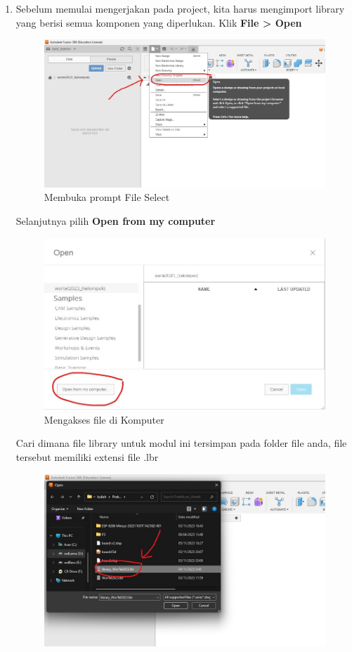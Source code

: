 \begin{enumerate}
\begin{figure}[H]
        \end{figure}
    \item Sebelum memulai mengerjakan pada project, kita harus mengimport library yang berisi semua komponen yang diperlukan. Klik \textbf{File > Open}
        \begin{figure}[H]
            \centering
            \includegraphics[width=0.6\linewidth]{P1/img/gambar3.jpeg}
            \caption{Membuka prompt File Select} 
            \label{fig:Membuka prompt File Select}
        \end{figure}
    Selanjutnya pilih \textbf{Open from my computer}
    \begin{figure}[H]
        \centering
        \includegraphics[width=0.6\linewidth]{P1/img/gambar4.jpeg}
        \caption{Mengakses file di Komputer} 
        \label{fig:Mengakses file di Komputer}
    \end{figure}
    Cari dimana file library untuk modul ini tersimpan pada folder file anda, file tersebut memiliki extensi file .lbr
    \begin{figure}[H]
        \centering
        \includegraphics[width=0.6\linewidth]{P1/img/gambar5.jpeg}

\end{figure}
\end{enumerate}
